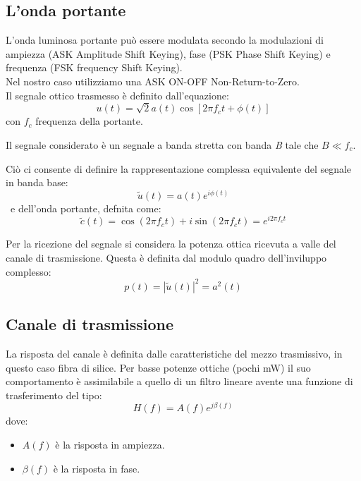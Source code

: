 \documentclass[12pt, a4paper]{article}
\begin{document}
\newpage
\subsection{L'onda portante}
\label{sub:}

\vspace{5mm}
L'onda luminosa portante può essere modulata secondo la modulazioni di ampiezza (ASK Amplitude Shift Keying), fase (PSK Phase Shift Keying) e frequenza (FSK frequency Shift Keying).\\
Nel nostro caso utilizziamo una ASK ON-OFF Non-Return-to-Zero.\\
Il segnale ottico trasmesso è definito dall'equazione:
\begin{equation}
	u(t) = \sqrt{2}a(t)\cos{[2\pi f_ct + \phi(t)]}
\end{equation}
con $f_c$ frequenza della portante.

Il segnale considerato è un segnale a banda stretta con banda \textit{B} tale che $B \ll f_c$.

Ciò ci consente di definire la rappresentazione complessa equivalente del segnale in banda base:
\begin{equation}
	\tilde{u}(t) = a(t)e^{i\phi(t)}
\end{equation}\
e dell'onda portante, defnita come:
\begin{equation}
	\tilde{c}(t) = \cos{(2\pi f_ct )}+ i\sin{(2\pi f_ct)} = e^{i2\pi f_c t}
\end{equation}

Per la ricezione del segnale si considera la potenza ottica ricevuta a valle del canale di trasmissione.
Questa è definita dal modulo quadro dell'inviluppo complesso:
\begin{equation}
	p(t) = |\tilde{u}(t)|^2 = a^2(t)
\end{equation}


\subsection{Canale di trasmissione}
\label{sub:Canale}

La risposta del canale è definita dalle caratteristiche del mezzo trasmissivo, in questo caso fibra di silice.
Per basse potenze ottiche (pochi mW) il suo comportamento è assimilabile a quello di un filtro lineare avente una funzione di trasferimento del tipo:
\begin{equation}
	H(f) = A(f) e^{j\beta(f)}
\end{equation}
dove:\begin{itemize}
	\item $A(f)$ è la risposta in ampiezza.
	\item $\beta(f)$ è la risposta in fase.
\end{itemize}
\end{document}
